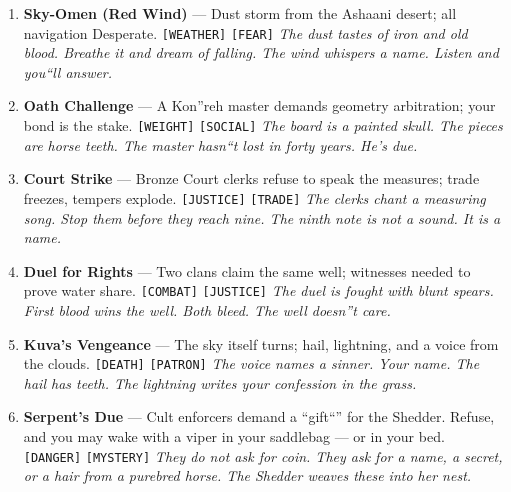 {{\begin{enumerate}
\item {} \textbf{Sky-Omen (Red Wind)} --- Dust storm from the Ashaani desert; all navigation Desperate. \texttt{[WEATHER]} \texttt{[FEAR]} \hfill \textit{The dust tastes of iron and old blood. Breathe it and dream of falling. The wind whispers a name. Listen and you``ll answer.}
\item {} \textbf{Oath Challenge} --- A Kon''reh master demands geometry arbitration; your bond is the stake. \texttt{[WEIGHT]} \texttt{[SOCIAL]} \hfill \textit{The board is a painted skull. The pieces are horse teeth. The master hasn``t lost in forty years. He's due.}
\item {} \textbf{Court Strike} --- Bronze Court clerks refuse to speak the measures; trade freezes, tempers explode. \texttt{[JUSTICE]} \texttt{[TRADE]} \hfill \textit{The clerks chant a measuring song. Stop them before they reach nine. The ninth note is not a sound. It is a name.}
\item {} \textbf{Duel for Rights} --- Two clans claim the same well; witnesses needed to prove water share. \texttt{[COMBAT]} \texttt{[JUSTICE]} \hfill \textit{The duel is fought with blunt spears. First blood wins the well. Both bleed. The well doesn''t care.}
\item {} \textbf{Kuva's Vengeance} --- The sky itself turns; hail, lightning, and a voice from the clouds. \texttt{[DEATH]} \texttt{[PATRON]} \hfill \textit{The voice names a sinner. Your name. The hail has teeth. The lightning writes your confession in the grass.}
\item {} \textbf{Serpent's Due} --- Cult enforcers demand a ``gift``'' for the Shedder. Refuse, and you may wake with a viper in your saddlebag --- or in your bed. \texttt{[DANGER]} \texttt{[MYSTERY]} \hfill \textit{They do not ask for coin. They ask for a name, a secret, or a hair from a purebred horse. The Shedder weaves these into her nest.}
\end{enumerate}

}}
